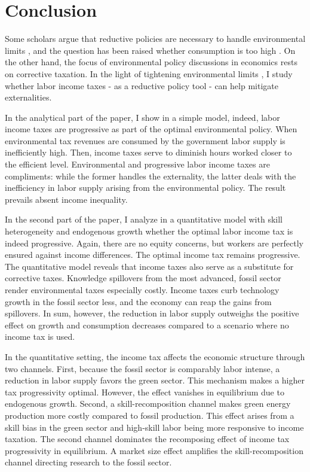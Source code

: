 \section{Conclusion}\label{sec:con}
Some scholars argue that  reductive policies are necessary to handle environmental limits \citep{Schor2005SustainableReduction}, and the question has been raised whether consumption is too high \citep{Arrow2004AreMuch, Dasgupta2021}. On the other hand, the focus of environmental policy discussions in economics rests on corrective taxation. In the light of tightening environmental limits \citep{Rockstrom2009AHumanity, IPCC2022}, I study whether labor income taxes - as a reductive policy tool - can help mitigate externalities. 

In the analytical part of the paper, I show in a simple model, indeed, labor income taxes are  progressive as part of the optimal environmental policy. %
When environmental tax revenues are consumed by the government labor supply is inefficiently high. Then, income taxes serve to diminish hours worked closer to the efficient level. Environmental and progressive labor income taxes are compliments: while the former handles the externality, the latter deals with the inefficiency in labor supply arising from the environmental policy.  The result prevails absent income inequality.


In the second part of the paper, I analyze in a quantitative model with skill heterogeneity and endogenous growth whether the optimal labor income tax is indeed progressive. Again, there are no equity concerns, but workers are perfectly ensured against income differences. 
The optimal income tax remains progressive. The quantitative model reveals that income taxes also serve as a substitute for corrective taxes. Knowledge spillovers from the most advanced, fossil sector render environmental taxes especially costly. Income taxes curb technology growth in the fossil sector less, and the economy can reap the gains from spillovers. In sum, however, the reduction in labor supply outweighs the positive effect on growth and consumption decreases compared to a scenario where no income tax is used. 

In the quantitative setting, the income tax affects the economic structure through two channels. First, because the fossil sector is comparably labor intense, a reduction in labor supply favors the green sector. This mechanism makes a higher tax progressivity optimal. However, the effect vanishes in equilibrium due to endogenous growth.
Second, a skill-recomposition channel makes green energy production more costly compared to fossil production. This effect arises from a skill bias in the green sector and high-skill labor being more responsive to income taxation. 
The second channel dominates the recomposing effect of  income tax progressivity in equilibrium. A market size effect amplifies the skill-recomposition channel directing research to the fossil sector. 

